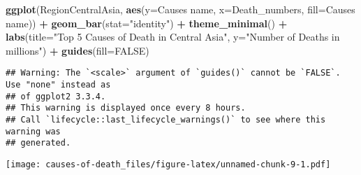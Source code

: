 \documentclass[
]{article}
\newenvironment{Shaded}{\begin{snugshade}}{\end{snugshade}}
\newcommand{\AttributeTok}[1]{\textcolor[rgb]{0.13,0.29,0.53}{#1}}
\newcommand{\ConstantTok}[1]{\textcolor[rgb]{0.56,0.35,0.01}{#1}}
\newcommand{\FunctionTok}[1]{\textcolor[rgb]{0.13,0.29,0.53}{\textbf{#1}}}
\newcommand{\NormalTok}[1]{#1}
\newcommand{\SpecialCharTok}[1]{\textcolor[rgb]{0.81,0.36,0.00}{\textbf{#1}}}
\newcommand{\StringTok}[1]{\textcolor[rgb]{0.31,0.60,0.02}{#1}}
\begin{document}
\begin{Shaded}
\begin{Highlighting}[]
\FunctionTok{ggplot}\NormalTok{(RegionCentralAsia, }\FunctionTok{aes}\NormalTok{(}\AttributeTok{y=}\StringTok{\textasciigrave{}}\AttributeTok{Causes name}\StringTok{\textasciigrave{}}\NormalTok{, }\AttributeTok{x=}\NormalTok{Death\_numbers, }\AttributeTok{fill=}\StringTok{\textasciigrave{}}\AttributeTok{Causes name}\StringTok{\textasciigrave{}}\NormalTok{)) }\SpecialCharTok{+}
  \FunctionTok{geom\_bar}\NormalTok{(}\AttributeTok{stat=}\StringTok{"identity"}\NormalTok{) }\SpecialCharTok{+}
  \FunctionTok{theme\_minimal}\NormalTok{() }\SpecialCharTok{+} 
  \FunctionTok{labs}\NormalTok{(}\AttributeTok{title=}\StringTok{"Top 5 Causes of Death in Central Asia"}\NormalTok{,}
       \AttributeTok{y=}\StringTok{"Number of Deaths in millions"}\NormalTok{) }\SpecialCharTok{+}
  \FunctionTok{guides}\NormalTok{(}\AttributeTok{fill=}\ConstantTok{FALSE}\NormalTok{)}
\end{Highlighting}
\end{Shaded}

\begin{verbatim}
## Warning: The `<scale>` argument of `guides()` cannot be `FALSE`. Use "none" instead as
## of ggplot2 3.3.4.
## This warning is displayed once every 8 hours.
## Call `lifecycle::last_lifecycle_warnings()` to see where this warning was
## generated.
\end{verbatim}

\texttt{[image: causes-of-death\_files/figure-latex/unnamed-chunk-9-1.pdf]}
\end{document}
